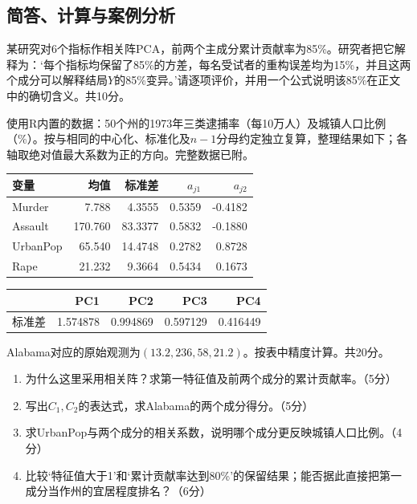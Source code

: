 \subsection{简答、计算与案例分析}

某研究对6个指标作相关阵PCA，前两个主成分累计贡献率为85\%。研究者把它解释为：‘每个指标均保留了85\%的方差，每名受试者的重构误差均为15\%，并且这两个成分可以解释结局$Y$的85\%变异。’请逐项评价，并用一个公式说明该85\%在正文中的确切含义。共10分。

使用R内置的数据：50个州的1973年三类逮捕率（每10万人）及城镇人口比例（\%）。按与相同的中心化、标准化及$n-1$分母约定独立复算，整理结果如下；各轴取绝对值最大系数为正的方向。完整数据已附。\par\begin{center}\small\begin{tabular}{lrrrr}\toprule 变量&均值&标准差&$a_{j1}$&$a_{j2}$\\\midrule Murder&7.788&4.3555&0.5359&-0.4182\\Assault&170.760&83.3377&0.5832&-0.1880\\UrbanPop&65.540&14.4748&0.2782&0.8728\\Rape&21.232&9.3664&0.5434&0.1673\\\bottomrule\end{tabular}\end{center}\begin{center}\small\begin{tabular}{lrrrr}\toprule&PC1&PC2&PC3&PC4\\\midrule 标准差&1.574878&0.994869&0.597129&0.416449\\\bottomrule\end{tabular}\end{center}\noindent Alabama对应的原始观测为$(13.2,236,58,21.2)$。按表中精度计算。共20分。\begin{enumerate}\item 为什么这里采用相关阵？求第一特征值及前两个成分的累计贡献率。（5分）\item 写出$C_1,C_2$的表达式，求Alabama的两个成分得分。（5分）\item 求UrbanPop与两个成分的相关系数，说明哪个成分更反映城镇人口比例。（4分）\item 比较‘特征值大于1’和‘累计贡献率达到80\%’的保留结果；能否据此直接把第一成分当作州的宜居程度排名？（6分）\end{enumerate}

